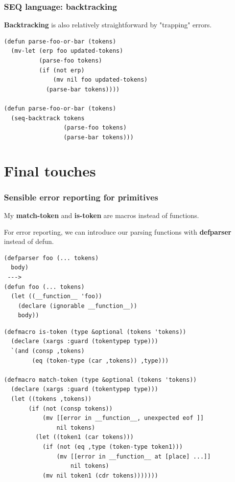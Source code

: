 \documentclass{beamer}
\newcommand{\SmallSkip}{\vspace{0.5cm}\noindent}
\begin{document}
\begin{frame}[fragile]
\frametitle{SEQ language: backtracking}

{\bf Backtracking} is also relatively straightforward by "trapping" errors.

{\small 
\begin{verbatim}          
(defun parse-foo-or-bar (tokens)
  (mv-let (erp foo updated-tokens)
          (parse-foo tokens)
          (if (not erp)
              (mv nil foo updated-tokens)
            (parse-bar tokens))))

(defun parse-foo-or-bar (tokens)
  (seq-backtrack tokens
                 (parse-foo tokens)
                 (parse-bar tokens)))
\end{verbatim}}
\end{frame}


\section{Final touches}
\begin{frame}[fragile]
\frametitle{Sensible error reporting for primitives}

My {\bf match-token} and {\bf is-token} are macros instead of functions.

\SmallSkip
For error reporting, we can introduce our parsing functions with {\bf defparser} 
instead of defun.

\begin{verbatim}
(defparser foo (... tokens) 
  body)
 --->
(defun foo (... tokens)
  (let ((__function__ 'foo))
    (declare (ignorable __function__))
    body))
\end{verbatim}

\end{frame}

\begin{frame}[fragile]
\begin{verbatim}
(defmacro is-token (type &optional (tokens 'tokens))
  (declare (xargs :guard (tokentypep type)))
  `(and (consp ,tokens)
        (eq (token-type (car ,tokens)) ,type)))

(defmacro match-token (type &optional (tokens 'tokens))
  (declare (xargs :guard (tokentypep type)))
  (let ((tokens ,tokens))
       (if (not (consp tokens))
           (mv [[error in __function__, unexpected eof ]] 
               nil tokens)
         (let ((token1 (car tokens)))
           (if (not (eq ,type (token-type token1)))
               (mv [[error in __function__ at [place] ...]]
                   nil tokens)
           (mv nil token1 (cdr tokens)))))))
\end{verbatim}
\end{frame}
\end{document}
